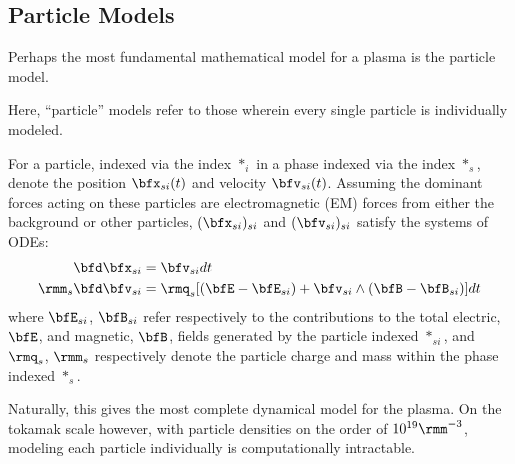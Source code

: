 \subsection{Particle Models}
    Perhaps the most fundamental mathematical model for a plasma is the particle model.

    \line

    \begin{definition}\label{def:particle model}
        Here, ``particle'' models refer to those wherein every single particle is individually modeled.
    \end{definition}
    
    \line

    For a particle, indexed via the index $*_{i}$ in a phase indexed via the index $*_{s}$, denote the position $\bfx_{si}(t)$ and velocity $\bfv_{si}(t)$. Assuming the dominant forces acting on these particles are electromagnetic (EM) forces from either the background or other particles, $(\bfx_{si})_{si}$ and $(\bfv_{si})_{si}$ satisfy the systems of ODEs:
    \begin{align}
        \bfd\bfx_{si}  &=  \bfv_{si} dt  \label{eqn:particle motion}  \\
        \rmm_{s}\bfd\bfv_{si}  &=  \rmq_{s}[(\bfE - \bfE_{si}) + \bfv_{si}\wedge(\bfB - \bfB_{si})]dt  \label{eqn:particle forcing}
    \end{align}
    where $\bfE_{si}$, $\bfB_{si}$ refer respectively to the contributions to the total electric, $\bfE$, and magnetic, $\bfB$, fields generated by the particle indexed $*_{si}$, and $\rmq_{s}$, $\rmm_{s}$ respectively denote the particle charge and mass within the phase indexed $*_{s}$.

    
    Naturally, this gives the most complete dynamical model for the plasma. On the tokamak scale however, with particle densities on the order of $10^{19}\rmm^{- 3}$, modeling each particle individually is computationally intractable.
    